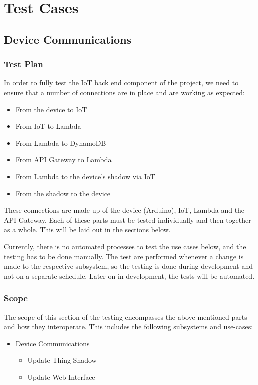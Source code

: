 \documentclass{article}
\begin{document}
\section{Test Cases}

	\subsection{Device Communications}
		\subsubsection{Test Plan}
			In order to fully test the IoT back end component of the project, we need to ensure that a number of connections are in place and are working as expected:
			\begin{itemize}
				\item{From the device to IoT}
				\item{From IoT to Lambda}
				\item{From Lambda to DynamoDB}
				\\
				\item{From API Gateway to Lambda}
				\item{From Lambda to the device's shadow via IoT}
				\item{From the shadow to the device}
			\end{itemize}
			
			These connections are made up of the device (Arduino), IoT, Lambda and the API Gateway. Each of these parts must be tested individually and then together as a whole. This will be laid out in the sections below.
			
			Currently, there is no automated processes to test the use cases below, and the testing has to be done manually. The test are performed whenever a change is made to the respective subsystem, so the testing is done during development and not on a separate schedule. Later on in development, the tests will be automated.
		\subsubsection{Scope}
			 The scope of this section of the testing encompasses the above mentioned parts and how they interoperate. This includes the following subsystems and use-cases:
			 \begin{itemize}
			 	\item Device Communications
				 	\begin{itemize}
				 		\item Update Thing Shadow
				 		\item Update Web Interface
				 	\end{itemize}
			 \end{itemize}
			 
\end{document}
